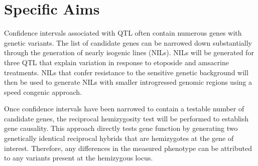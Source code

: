 \documentclass[12pt]{article}
\begin{document}
\newpage


\pagestyle{fancy}
\section{Specific Aims}
\fancyhf{}
\renewcommand{\footrulewidth}{1pt}


\vspace{5pt}

\vspace{10pt}

 Confidence intervals associated with QTL often contain numerous genes with genetic variants. The list of candidate genes can be narrowed down substantially through the generation of nearly isogenic lines (NILs). NILs will be generated for three QTL that explain variation in response to etoposide and amsacrine treatments. NILs that confer resistance to the sensitive genetic background will then be used to generate NILs with smaller introgressed genomic regions using a speed congenic approach.
\vspace{15pt}

\vspace{10pt}

 Once confidence intervals have been narrowed to contain a testable number of candidate genes, the reciprocal hemizygosity test will be performed to establish gene causality. This approach directly tests gene function by generating two genetically identical reciprocal hybrids that are hemizygotes at the gene of interest. Therefore, any differences in the measured phenotype can be attributed to any variants present at the hemizygous locus.  
\vspace{5pt}
\end{document}
